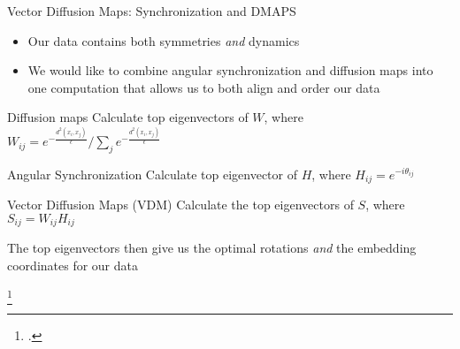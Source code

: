 \begin{frame}{Vector Diffusion Maps: Synchronization and DMAPS}
	\begin{itemize}
		\item Our data contains both symmetries {\em and} dynamics
		\item We would like to combine angular synchronization and diffusion maps into one computation that allows us to both align and order our data
	\end{itemize}
	
	\begin{minipage}{0.45\textwidth}
	\begin{block}{Diffusion maps}
		Calculate top eigenvectors of $W$, where $W_{ij} = e^{-\frac{d^2(x_i, x_j)}{\epsilon}} / \sum_j e^{-\frac{d^2(x_i, x_j)}{\epsilon}} $
	\end{block}
	\end{minipage}	
	\hfill
	\begin{minipage}{0.45\textwidth}	
	\begin{block}{Angular Synchronization}
		Calculate top eigenvector of $H$, where $H_{ij} = e^{-i \theta_{ij}}$
	\end{block}
	\end{minipage}
	
	\begin{block}{Vector Diffusion Maps (VDM) \footnotemark} 
		Calculate the top eigenvectors of $S$, where $S_{ij} = W_{ij}H_{ij}$
		
		The top eigenvectors then give us the optimal rotations {\em and} the embedding coordinates for our data
	\end{block}
	\footcitetext{singer2012vector}

	\centering

	

\end{frame}
